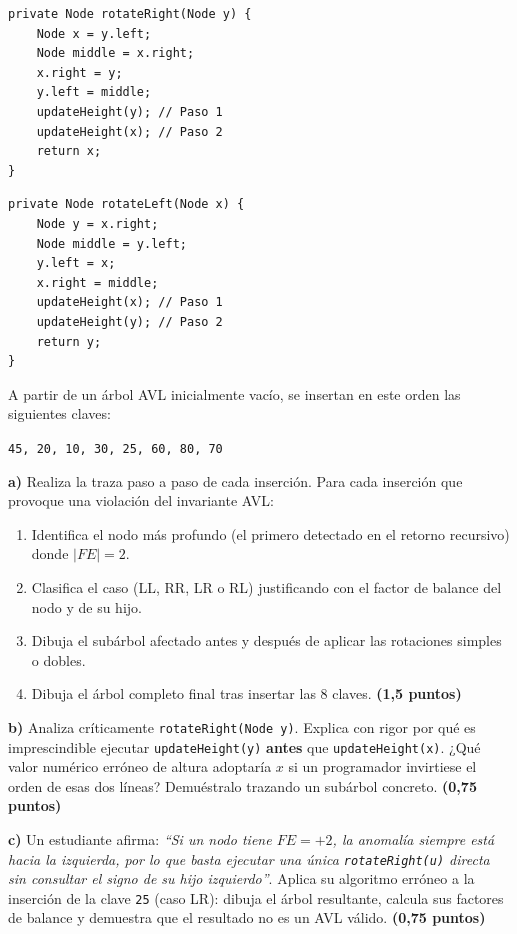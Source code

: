 \documentclass[10pt,a4paper]{article}
\newcommand{\pts}[1]{\textbf{(#1)}}
\begin{document}
\begin{minipage}[t]{0.485\textwidth}
\begin{lstlisting}
private Node rotateRight(Node y) {
    Node x = y.left;
    Node middle = x.right;
    x.right = y;
    y.left = middle;
    updateHeight(y); // Paso 1
    updateHeight(x); // Paso 2
    return x;
}
\end{lstlisting}
\end{minipage}\hfill
\begin{minipage}[t]{0.495\textwidth}
\begin{lstlisting}
private Node rotateLeft(Node x) {
    Node y = x.right;
    Node middle = y.left;
    y.left = x;
    x.right = middle;
    updateHeight(x); // Paso 1
    updateHeight(y); // Paso 2
    return y;
}
\end{lstlisting}
\end{minipage}

A partir de un árbol AVL inicialmente vacío, se insertan en este orden las siguientes claves:
\begin{center}
\texttt{45, 20, 10, 30, 25, 60, 80, 70}
\end{center}

\textbf{a)} Realiza la traza paso a paso de cada inserción. Para cada inserción que provoque una violación del invariante AVL:
\begin{enumerate}[label=\roman*.,itemsep=1pt]
\item Identifica el nodo más profundo (el primero detectado en el retorno recursivo) donde $|FE| = 2$.
\item Clasifica el caso (LL, RR, LR o RL) justificando con el factor de balance del nodo y de su hijo.
\item Dibuja el subárbol afectado antes y después de aplicar las rotaciones simples o dobles.
\item Dibuja el árbol completo final tras insertar las 8 claves. \pts{1,5 puntos}
\end{enumerate}

\textbf{b)} Analiza críticamente \texttt{rotateRight(Node y)}. Explica con rigor por qué es imprescindible ejecutar \texttt{updateHeight(y)} \textbf{antes} que \texttt{updateHeight(x)}. ¿Qué valor numérico erróneo de altura adoptaría $x$ si un programador invirtiese el orden de esas dos líneas? Demuéstralo trazando un subárbol concreto. \pts{0,75 puntos}

\textbf{c)} Un estudiante afirma: \emph{``Si un nodo tiene $FE = +2$, la anomalía siempre está hacia la izquierda, por lo que basta ejecutar una única \texttt{rotateRight(u)} directa sin consultar el signo de su hijo izquierdo''}. Aplica su algoritmo erróneo a la inserción de la clave \texttt{25} (caso LR): dibuja el árbol resultante, calcula sus factores de balance y demuestra que el resultado no es un AVL válido. \pts{0,75 puntos}
\end{document}
